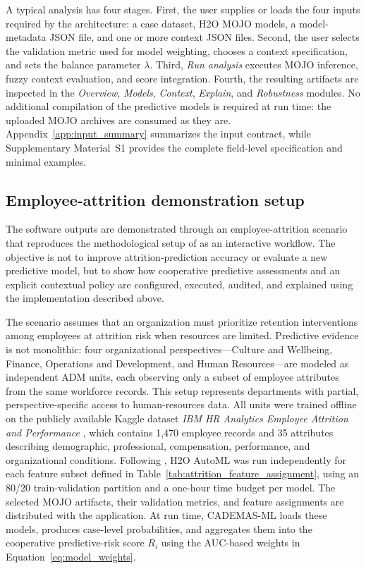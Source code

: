 \documentclass{interact}
\begin{document}
A typical analysis has four stages. First, the user supplies or loads the four inputs required by the architecture: a case dataset, H2O MOJO models, a model-metadata JSON file, and one or more context JSON files. Second, the user selects the validation metric used for model weighting, chooses a context specification, and sets the balance parameter $\lambda$. Third, \textit{Run analysis} executes MOJO inference, fuzzy context evaluation, and score integration. Fourth, the resulting artifacts are inspected in the \textit{Overview}, \textit{Models}, \textit{Context}, \textit{Explain}, and \textit{Robustness} modules. No additional compilation of the predictive models is required at run time: the uploaded MOJO archives are consumed as they are. Appendix~\ref{app:input_summary} summarizes the input contract, while Supplementary Material~S1 provides the complete field-level specification and minimal examples.

\subsection{Employee-attrition demonstration setup}\label{sec:demonstration}

The software outputs are demonstrated through an employee-attrition scenario that reproduces the methodological setup of \citet{Godz2026} as an interactive workflow. The objective is not to improve attrition-prediction accuracy or evaluate a new predictive model, but to show how cooperative predictive assessments and an explicit contextual policy are configured, executed, audited, and explained using the implementation described above.

The scenario assumes that an organization must prioritize retention interventions among employees at attrition risk when resources are limited. Predictive evidence is not monolithic: four organizational perspectives---Culture and Wellbeing, Finance, Operations and Development, and Human Resources---are modeled as independent ADM units, each observing only a subset of employee attributes from the same workforce records. This setup represents departments with partial, perspective-specific access to human-resources data. All units were trained offline on the publicly available Kaggle dataset \textit{IBM HR Analytics Employee Attrition and Performance} \citep{IBMHRKaggle}, which contains 1,470 employee records and 35 attributes describing demographic, professional, compensation, performance, and organizational conditions. Following \citet{Godz2026}, H2O AutoML was run independently for each feature subset defined in Table~\ref{tab:attrition_feature_assignment}, using an 80/20 train-validation partition and a one-hour time budget per model. The selected MOJO artifacts, their validation metrics, and feature assignments are distributed with the application. At run time, CADEMAS-ML loads these models, produces case-level probabilities, and aggregates them into the cooperative predictive-risk score $R_i$ using the AUC-based weights in Equation~\eqref{eq:model_weights}.
\end{document}
